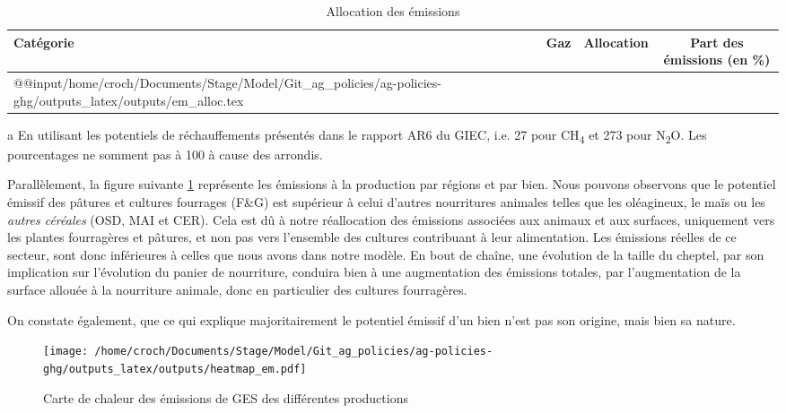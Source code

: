 \begin{table}[h!]
    \caption{Allocation des émissions}
    \label{tab:em_allocation}
    \centering
    \begin{threeparttable}
        \begin{tabularx}{\textwidth}{p{1.77in}p{0.95in}p{1.19in}c}
            \hline
            \textbf{Catégorie} & \textbf{Gaz} & \textbf{Allocation} & \textbf{Part des émissions}\tnote{a} (en \%) \\ \hline
            \csname @@input\endcsname /home/croch/Documents/Stage/Model/Git_ag_policies/ag-policies-ghg/outputs_latex/outputs/em_alloc.tex
            \hline
        \end{tabularx}
        \begin{tablenotes}
            \footnotesize
            \item[a] En utilisant les potentiels de réchauffements présentés dans le rapport AR6 du GIEC, i.e. 27 pour CH\textsubscript{4} et 273 pour N\textsubscript{2}O. Les pourcentages ne somment pas à 100 à cause des arrondis.
        \end{tablenotes}
    \end{threeparttable}
\end{table}

Parallèlement, la figure suivante \ref{fig:em} représente les émissions à la production par régions et par bien. Nous pouvons observons que le potentiel émissif des pâtures et cultures fourrages (F\&G) est supérieur à celui d'autres nourritures animales telles que les oléagineux, le maïs ou les \textit{autres céréales} (OSD, MAI et CER). Cela est dû à notre réallocation des émissions associées aux animaux et aux surfaces, uniquement vers les plantes fourragères et pâtures, et non pas vers l'ensemble des cultures contribuant à leur alimentation. Les émissions réelles de ce secteur, sont donc inférieures à celles que nous avons dans notre modèle. En bout de chaîne, une évolution de la taille du cheptel, par son implication sur l'évolution du panier de nourriture, conduira bien à une augmentation des émissions totales, par l'augmentation de la surface allouée à la nourriture animale, donc en particulier des cultures fourragères.

On constate également, que ce qui explique majoritairement le potentiel émissif d'un bien n'est pas son origine, mais bien sa nature.

\begin{figure}[h!]
    \centering
    \texttt{[image: /home/croch/Documents/Stage/Model/Git\_ag\_policies/ag-policies-ghg/outputs\_latex/outputs/heatmap\_em.pdf]}
    \caption{Carte de chaleur des émissions de GES des différentes productions}
    \label{fig:em}
\end{figure}

